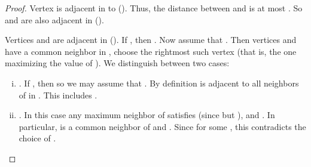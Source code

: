 \documentclass[]{elsarticle}
\begin{document}
\begin{proof}
 Vertex  is adjacent in  to  (). 
Thus, the distance between  and  is at most . 
So  and  are also adjacent in  ().

 Vertices  and  are adjacent in  ().
If , then .
Now assume that .
Then vertices  and  have a common neighbor  in , choose the rightmost such vertex (that is,
the one maximizing the value of ).
We distinguish between two cases:
\begin{enumerate}[(i)]
    \item .
    If , then  so we may assume that .
    By definition  is adjacent to all neighbors of  in . 
    This includes .

    \item . In this case any maximum neighbor  of  satisfies  (since  but ),  and . 
    In particular,  is a common neighbor of  and . 
    Since  for some , this contradicts the choice of .
\end{enumerate}
\end{proof}
\end{document}
